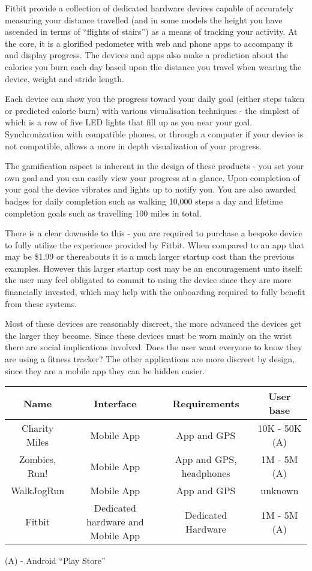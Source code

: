 Fitbit provide a collection of dedicated hardware devices capable of
accurately measuring your distance travelled (and in some models the
height you have ascended in terms of ``flights of stairs'') as a means
of tracking your activity. At the core, it is a glorified pedometer
with web and phone apps to accompany it and display progress. The
devices and apps also make a prediction about the calories you burn each
day based upon the distance you travel when wearing the device, weight
and stride length. 

Each device can show you the progress toward your daily goal (either
steps taken or predicted calorie burn) with various visualisation
techniques - the simplest of which is a row of five LED lights that
fill up as you near your goal. Synchronization with compatible phones,
or through a computer if your device is not compatible, allows a more
in depth visualization of your progress.

The gamification aspect is inherent in the design of these products -
you set your own goal and you can easily view your progress at a
glance. Upon completion of your goal the device vibrates and lights up
to notify you. You are also awarded badges for daily completion such
as walking 10,000 steps a day and lifetime completion goals such as
travelling 100 miles in total.

There is a clear downside to this - you are required to purchase a
bespoke device to fully utilize the experience provided by
Fitbit. When compared to an app that may be \$1.99 or thereabouts it is
a much larger startup cost than the previous examples. However this
larger startup cost may be an encouragement unto itself: the user may
feel obligated to commit to using the device since they are more
financially invested, which may help with the onboarding required to
fully benefit from these systems.

Most of these devices are reasonably discreet, the more advanced the
devices get the larger they become. Since these devices must be worn
mainly on the wrist there are social implications involved. Does the
user want everyone to know they are using a fitness tracker? The other
applications are more discreet by design, since they are a mobile app
they can be hidden easier. 

\begin{tabular}{ | c | c | c | c |} \hline
 Name & Interface & Requirements & User base  \\ \hline
 Charity Miles & Mobile App & App and GPS & 10K - 50K (A)\\ \hline
 Zombies, Run! & Mobile App & App and GPS, headphones & 1M - 5M (A)\\ \hline
 WalkJogRun & Mobile App & App and GPS  & unknown \\ \hline
 Fitbit & Dedicated hardware and Mobile App & Dedicated Hardware & 1M - 5M (A)\\ \hline
\end{tabular}
(A) - Android ``Play Store''


